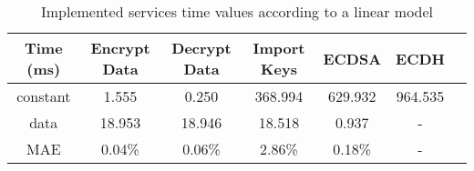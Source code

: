 \begin{table}[h!]
\centering
\def\arraystretch{1.5}
\begin{tabular}{|c|c|c|c|c|c|c|}
\hline
	Time (ms)   & Encrypt Data  & Decrypt Data  & Import Keys & ECDSA & ECDH   \\ \hline
	constant  & 1.555 & 0.250 & 368.994  & 629.932 & 964.535 \\ \hline
	data  & 18.953 & 18.946 & 18.518 & 0.937 & - \\ \hline
	MAE	  & 0.04\% & 0.06\% & 2.86\% & 0.18\% & - \\ \hline
\end{tabular}
\caption{Implemented services time values according to a linear model}
\label{tab:services-model}
\end{table}

